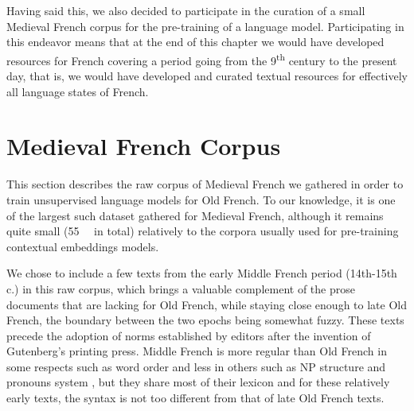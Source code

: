 Having said this, we also decided to participate in the curation of a small Medieval French corpus for the pre-training of a language model. Participating in this endeavor means that at the end of this chapter we would have developed resources for French covering a period going from the 9\textsuperscript{th} century to the present day, that is, we would have developed and curated textual resources for effectively all language states of French.

\section{Medieval French Corpus}
\label{sec-data}

This section describes the raw corpus of Medieval French we gathered in order to train unsupervised language models for Old French. To our knowledge, it is one of the largest such dataset gathered for Medieval French, although it remains quite small (\SI{55}{\mebi\byte} in total) relatively to the corpora usually used for pre-training contextual embeddings models.

We chose to include a few texts from the early Middle French period (14th-15th c.) in this raw corpus, which brings a valuable complement of the prose documents that are lacking for Old French, while staying close enough to late Old French, the boundary between the two epochs being somewhat fuzzy. These texts precede the adoption of norms established by editors after the invention of Gutenberg's printing press. Middle French is more regular than Old French in some respects such as word order \citep{marchello-Nizia-etal-2020-grande} and less in others such as NP structure and pronouns system \citep{marchello-nizia-etal-1979-histoire}, but they share most of their lexicon and for these relatively early texts, the syntax is not too different from that of late Old French texts.

